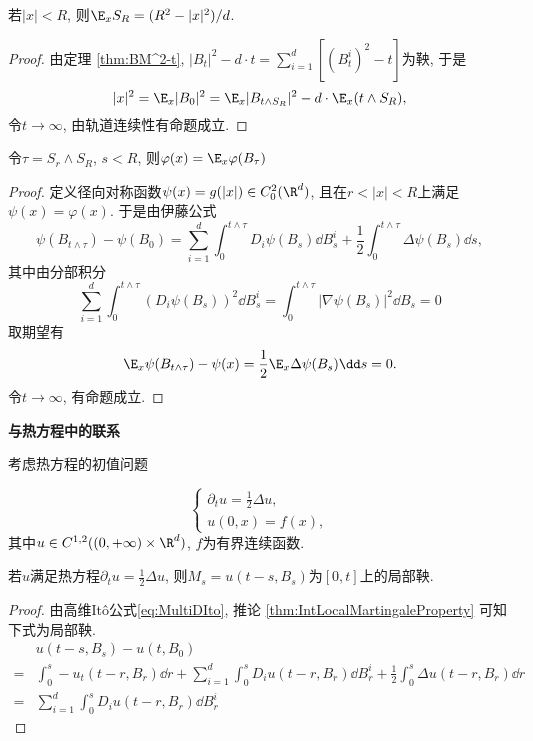 \documentclass[a4paper, 10pt]{ctexart}
\begin{document}
\begin{theorem}
	若$|x| < R$, 则$\E_x S_R = (R^2 - |x|^2) / d$. 
\end{theorem}
\begin{proof}
	由定理 \ref{thm:BM^2-t}, $|B_t|^2 - d \cdot t = \sum_{i=1}^d [(B_t^i)^2 - t]$为鞅, 于是
	\begin{equation*}
		|x|^2 = \E_x |B_0|^2 = \E_x |B_{t \wedge S_R}|^2 - d \cdot \E_x ( t \wedge S_R ), 
	\end{equation*}
	令$t \to \infty$, 由轨道连续性有命题成立. 
\end{proof}

\begin{theorem}
	令$\tau = S_r \wedge S_R$, $s < R$, 则$\varphi(x) = \E_x \varphi(B_{\tau})$
\end{theorem}
\begin{proof}
	定义径向对称函数$\psi(x) = g(|x|) \in C_0^2(\R^d)$, 且在$r < |x| < R$上满足$\psi(x) = \varphi(x)$. 
	于是由伊藤公式
	\begin{equation*}
		\psi(B_{t \wedge \tau}) - \psi(B_0)
		= \sum_{i=1}^d \int_0^{t \wedge \tau} D_i \psi(B_s) \dd B_s^i + \frac{1}{2} \int_0^{t \wedge \tau} \Delta \psi(B_s) \dd s, 
	\end{equation*}
	其中由分部积分
	\begin{equation*}
		\sum_{i=1}^d \int_0^{t \wedge \tau} ( D_i \psi(B_s) )^2 \dd B_s^i 
		= \int_0^{t \wedge \tau} |\nabla \psi(B_s)|^2 \dd B_s
		= 0
	\end{equation*}
	取期望有
	\begin{equation*}
		\E_x \psi(B_{t \wedge \tau}) - \psi(x)
		= \frac{1}{2} \E_x \Delta \psi(B_s) \dd s 
		= 0. 
	\end{equation*}
	令$t \to \infty$, 有命题成立.
\end{proof}

\noindent\textbf{\keben \large 与热方程中的联系}

考虑热方程的初值问题

\begin{equation*}
	\begin{cases}
		\partial_t u = \frac{1}{2} \Delta u, \\
		u(0, x) = f(x), 
	\end{cases}
\end{equation*}
其中$u \in C^{1,2}((0, +\infty) \times \R^d)$, $f$为有界连续函数. 

\begin{theorem}
	若$u$满足热方程$\partial_t u = \frac{1}{2} \Delta u$, 则$M_s = u(t-s, B_s)$为$[0,t]$上的局部鞅.
\end{theorem}
\begin{proof}
	由高维Itô公式\eqref{eq:MultiDIto}, 推论 \ref{thm:IntLocalMartingaleProperty} 可知下式为局部鞅. 
	\begin{align*}
		&u(t-s, B_s) - u(t, B_0) \\
		=& \int_0^s - u_t(t-r, B_r) \dd r + \sum_{i=1}^d \int_0^s D_i u(t-r, B_r) \dd B_r^i + \frac{1}{2} \int_0^s \Delta u(t-r, B_r) \dd r \\
		=& \sum_{i=1}^d \int_0^s D_i u(t-r, B_r) \dd B_r^i 
	\end{align*}
\end{proof}
\end{document}
